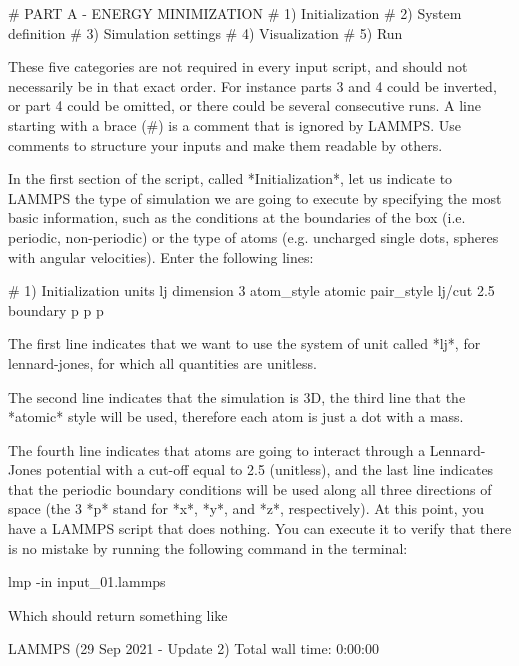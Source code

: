 \begin{lcverbatim}
# PART A - ENERGY MINIMIZATION
# 1) Initialization
# 2) System definition
# 3) Simulation settings
# 4) Visualization
# 5) Run
\end{lcverbatim}

These five categories are not required in every
input script, and should not necessarily be in that
exact order. For instance parts 3 and 4 could be inverted, or
part 4 could be omitted, or there could be several
consecutive runs.
A line starting with a brace (#) is a comment
that is ignored by LAMMPS. Use comments to structure 
your inputs and make them readable by others.

In the first section of the script, called *Initialization*,
let us indicate to LAMMPS the type of simulation we are
going to execute by specifying the most basic information,
such as the conditions at the boundaries of the box (i.e.
periodic, non-periodic) or the type of atoms (e.g. uncharged
single dots, spheres with angular velocities). Enter the
following lines:

\begin{lcverbatim}
# 1) Initialization
units lj
dimension 3
atom_style atomic
pair_style lj/cut 2.5
boundary p p p
\end{lcverbatim}

The first line indicates that we want to
use the system of unit called *lj*, for lennard-jones, for which all quantities
are unitless. 


The second line indicates that the simulation
is 3D, the third line that the *atomic* style
will be used, therefore each atom is just a dot with a mass.


The fourth line indicates that atoms are going to interact
through a Lennard-Jones potential with a cut-off equal to
2.5 (unitless), and the last line indicates that the
periodic boundary conditions will be used along all three
directions of space (the 3 *p* stand for *x*, *y*, and *z*,
respectively).
At this point, you have a LAMMPS script that does nothing.
You can execute it to verify that there is no mistake by
running the following command in the terminal:

\begin{lcverbatim}
lmp -in input_01.lammps
\end{lcverbatim}

Which should return something like

\begin{lcverbatim}
LAMMPS (29 Sep 2021 - Update 2)
Total wall time: 0:00:00
\end{lcverbatim}

